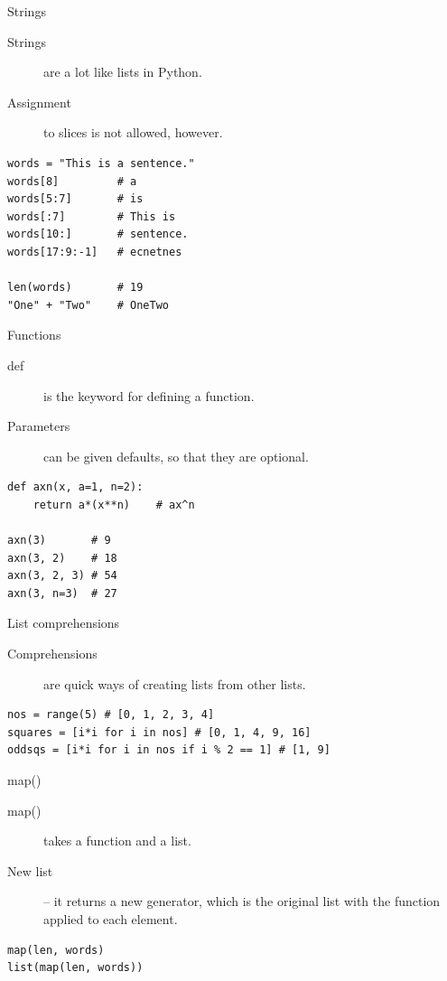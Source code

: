 \begin{frame}[fragile]{Strings}
	\begin{description}
	  \item[Strings] are a lot like lists in Python.
	  \item[Assignment] to slices is not allowed, however.
	\end{description}
	\begin{verbatim}
words = "This is a sentence."
words[8]         # a
words[5:7]       # is
words[:7]        # This is
words[10:]       # sentence.
words[17:9:-1]   # ecnetnes

len(words)       # 19
"One" + "Two"    # OneTwo
  \end{verbatim}
\end{frame}

\begin{frame}[fragile]{Functions}
	\begin{description}
	  \item[def] is the keyword for defining a function.
	  \item[Parameters] can be given defaults, so that they are optional.
	\end{description}
	\begin{verbatim}
def axn(x, a=1, n=2):
	return a*(x**n)    # ax^n
 
axn(3)       # 9
axn(3, 2)    # 18
axn(3, 2, 3) # 54
axn(3, n=3)  # 27
  \end{verbatim}
\end{frame}

\begin{frame}[fragile]{List comprehensions}
	\begin{description}
	  \item[Comprehensions] are quick ways of creating lists from other lists.
	\end{description}
	\begin{verbatim}
nos = range(5) # [0, 1, 2, 3, 4]
squares = [i*i for i in nos] # [0, 1, 4, 9, 16]
oddsqs = [i*i for i in nos if i % 2 == 1] # [1, 9]
  \end{verbatim}
\end{frame}



\begin{frame}[fragile]{map()}
	\begin{description}
	  \item[map()] takes a function and a list.
	  \item[New list] -- it returns a new generator, which is the original list with the function applied to each element.
	\end{description}
	\begin{verbatim}
map(len, words)
list(map(len, words))
  \end{verbatim}
\end{frame}



